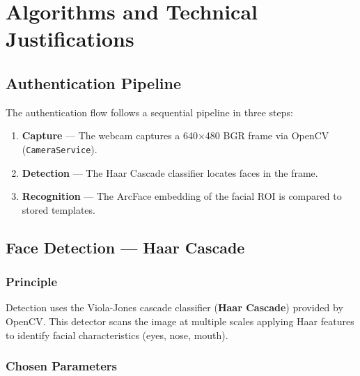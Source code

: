 \chapter{Algorithms and Technical Justifications}

\section{Authentication Pipeline}

The authentication flow follows a sequential pipeline in three steps:

\begin{enumerate}
    \item \textbf{Capture} — The webcam captures a 640$\times$480 BGR frame via OpenCV (\texttt{CameraService}).
    \item \textbf{Detection} — The Haar Cascade classifier locates faces in the frame.
    \item \textbf{Recognition} — The ArcFace embedding of the facial ROI is compared to stored templates.
\end{enumerate}


\section{Face Detection — Haar Cascade}

\subsection{Principle}

Detection uses the Viola-Jones cascade classifier (\textbf{Haar Cascade}) provided by OpenCV. This detector scans the image at multiple scales applying Haar features to identify facial characteristics (eyes, nose, mouth).

\subsection{Chosen Parameters}


